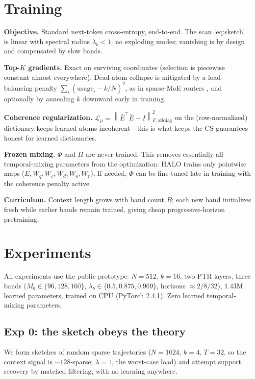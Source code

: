 \documentclass[11pt]{article}
\newcommand{\norm}[1]{\left\lVert #1 \right\rVert}
\begin{document}
\section{Training}
\label{sec:training}

\textbf{Objective.} Standard next-token cross-entropy, end-to-end. The scan \eqref{eq:sketch} is linear with spectral radius $\lambda_b < 1$: no exploding modes; vanishing is by design and compensated by slow bands.

\textbf{Top-$K$ gradients.} Exact on surviving coordinates (selection is piecewise constant almost everywhere). Dead-atom collapse is mitigated by a load-balancing penalty $\sum_i (\mathrm{usage}_i - k/N)^2$, as in sparse-MoE routers \citep{fedus2022switch}, and optionally by annealing $k$ downward early in training.

\textbf{Coherence regularization.} $\mathcal{L}_\mu = \norm{\bar E^\top \bar E - I}^2_{F,\mathrm{offdiag}}$ on the (row-normalized) dictionary keeps learned atoms incoherent---this is what keeps the CS guarantees honest for learned dictionaries.

\textbf{Frozen mixing.} $\Phi$ and $\Pi$ are never trained. This removes essentially all temporal-mixing parameters from the optimization: HALO trains only pointwise maps ($E, W_q, W_c, W_d, W_o, W_r$). If needed, $\Phi$ can be fine-tuned late in training with the coherence penalty active.

\textbf{Curriculum.} Context length grows with band count $B$; each new band initializes fresh while earlier bands remain trained, giving cheap progressive-horizon pretraining.

\section{Experiments}
\label{sec:exp}

All experiments use the public prototype: $N = 512$, $k = 16$, two PTR layers, three bands ($M_b \in \{96, 128, 160\}$, $\lambda_b \in \{0.5, 0.875, 0.969\}$, horizons $\approx 2/8/32$), $1.43$M learned parameters, trained on CPU (PyTorch 2.4.1). Zero learned temporal-mixing parameters.

\subsection{Exp 0: the sketch obeys the theory}
\label{sec:exp0}

We form sketches of random sparse trajectories ($N{=}1024$, $k{=}4$, $T{=}32$, so the context signal is ${\sim}128$-sparse; $\lambda = 1$, the worst-case load) and attempt support recovery by matched filtering, with no learning anywhere.
\end{document}
